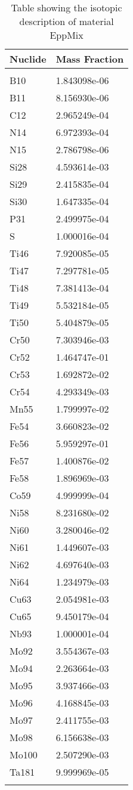 \begin{centering}
\begin{longtable}[ht!]
\caption{Table showing the isotopic description of material PPWheels}
\label{table:material_PPWheels}
\end{longtable}\clearpage

\begin{longtable}[ht!]
{ p{} | p{} }
\hline
Nuclide & Mass Fraction\\
\hline
\\
B10 & 1.843098e-06\\
B11 & 8.156930e-06\\
C12 & 2.965249e-04\\
N14 & 6.972393e-04\\
N15 & 2.786798e-06\\
Si28 & 4.593614e-03\\
Si29 & 2.415835e-04\\
Si30 & 1.647335e-04\\
P31 & 2.499975e-04\\
S & 1.000016e-04\\
Ti46 & 7.920085e-05\\
Ti47 & 7.297781e-05\\
Ti48 & 7.381413e-04\\
Ti49 & 5.532184e-05\\
Ti50 & 5.404879e-05\\
Cr50 & 7.303946e-03\\
Cr52 & 1.464747e-01\\
Cr53 & 1.692872e-02\\
Cr54 & 4.293349e-03\\
Mn55 & 1.799997e-02\\
Fe54 & 3.660823e-02\\
Fe56 & 5.959297e-01\\
Fe57 & 1.400876e-02\\
Fe58 & 1.896969e-03\\
Co59 & 4.999999e-04\\
Ni58 & 8.231680e-02\\
Ni60 & 3.280046e-02\\
Ni61 & 1.449607e-03\\
Ni62 & 4.697640e-03\\
Ni64 & 1.234979e-03\\
Cu63 & 2.054981e-03\\
Cu65 & 9.450179e-04\\
Nb93 & 1.000001e-04\\
Mo92 & 3.554367e-03\\
Mo94 & 2.263664e-03\\
Mo95 & 3.937466e-03\\
Mo96 & 4.168845e-03\\
Mo97 & 2.411755e-03\\
Mo98 & 6.156638e-03\\
Mo100 & 2.507290e-03\\
Ta181 & 9.999969e-05\\
\caption{Table showing the isotopic description of material EppMix}
\label{table:material_EppMix}
\end{longtable}\clearpage


\end{centering}
